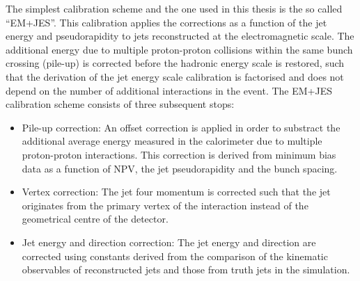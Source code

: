 The simplest calibration scheme and the one used in this thesis is the so called ``EM+JES''. This calibration applies the corrections as a function of the jet energy and pseudorapidity to jets reconstructed at the electromagnetic scale.  The additional energy due to multiple proton-proton collisions within the same bunch crossing (pile-up) is corrected before the hadronic energy scale is restored, such that the derivation of the jet energy scale calibration is factorised and does not depend on the number of additional interactions in the event. The EM+JES calibration scheme consists of three subsequent stops:

\begin{itemize}
\item
Pile-up correction: An offset correction is applied in order to substract the additional average energy measured in the calorimeter due to multiple proton-proton interactions. This correction is derived from minimum bias data as a function of NPV, the jet pseudorapidity and the bunch spacing.
\item
Vertex correction: The jet four momentum is corrected such that the jet originates from the primary vertex of the interaction instead of the geometrical centre of the detector. 
\item
Jet energy and direction correction: The jet energy and direction are corrected using constants derived from the comparison of the kinematic observables of reconstructed jets and those from truth jets in the simulation.
\end{itemize}

